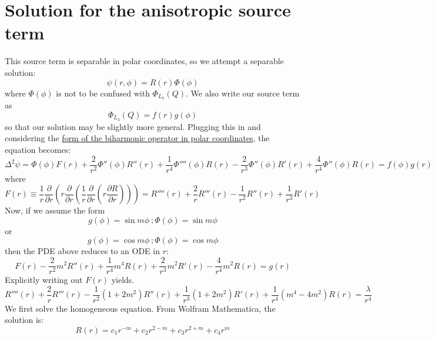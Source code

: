 \documentclass[reqno]{article}
\begin{document}
\section{Solution for the anisotropic source term}
This source term is separable in polar coordinates, so we attempt a separable solution:
\begin{equation}
  \psi(r, \phi) = R(r) \Phi (\phi)
\end{equation}
where $\Phi(\phi)$ is not to be confused with $\Phi_{L_3}(Q)$.
We also write our source term as
\begin{equation}
  \Phi_{L_3}(Q) = f(r) g(\phi)
\end{equation}
so that our solution may be slightly more general.
Plugging this in and considering the \href{https://www.wikiwand.com/en/Biharmonic_equation}{form of the biharmonic operator in polar coordinates}, the equation becomes:
\begin{equation}
  \Delta^2 \psi =
  \Phi(\phi) F(r)
  + \frac{2}{r^2} \Phi''(\phi) R''(r)
  + \frac{1}{r^4} \Phi''''(\phi) R(r)
  - \frac{2}{r^3} \Phi''(\phi) R'(r)
  + \frac{4}{r^4} \Phi''(\phi) R(r)
  =
  f(\phi) g(r)
\end{equation}
where
\begin{equation}
  F(r) \equiv
  \frac{1}{r} \frac{\partial}{\partial r} \left(
  r \frac{\partial}{\partial r} \left(
  \frac{1}{r} \frac{\partial}{\partial r} \left(
  r \frac{\partial R}{\partial r}
  \right)
  \right)
  \right)
  =
  R''''(r)
  + \frac{2}{r} R'''(r)
  - \frac{1}{r^2} R''(r)
  + \frac{1}{r^3} R'(r)
\end{equation}
Now, if we assume the form
\begin{equation}
  g(\phi) = \sin m \phi \: ;
  \Phi(\phi) = \sin m \phi
\end{equation}
or
\begin{equation}
  g(\phi) = \cos m \phi \: ;
  \Phi(\phi) = \cos m \phi
\end{equation}
then the PDE above reduces to an ODE in $r$:
\begin{equation}
  F(r)
  - \frac{2}{r^2} m^2 R''(r)
  + \frac{1}{r^4} m^4 R(r)
  + \frac{2}{r^3} m^2 R'(r)
  - \frac{4}{r^4} m^2 R(r)
  =
  g(r)
\end{equation}
Explicitly writing out $F(r)$ yields.
\begin{equation}
  R''''(r)
  + \frac{2}{r} R'''(r)
  - \frac{1}{r^2} \left(1 + 2m^2\right) R''(r)
  + \frac{1}{r^3} \left(1 + 2m^2\right) R'(r)
  + \frac{1}{r^4} \left(m^4 - 4m^2\right) R(r)
  = \frac{\lambda}{r^4}
\end{equation}
We first solve the homogeneous equation.
From Wolfram Mathematica, the solution is:
\begin{equation}
  R(r) =
  c_1 r^{-m}
  + c_2 r^{2 - m}
  + c_3 r^{2 + m}
  + c_4 r^m
\end{equation}
\end{document}
